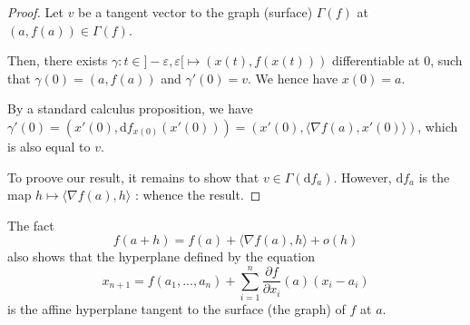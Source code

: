 \begin{proof}
    Let $ v $ be a tangent vector to the graph (surface) $ \Gamma(f) $ at $ (a, f(a)) \in \Gamma(f) $.

    Then, there exists $ \gamma : t \in ]-\varepsilon, \varepsilon[ \mapsto (x(t), f(x(t))) $ differentiable at $ 0 $, such that $ \gamma(0) = (a,f(a)) $ and $ \gamma'(0) = v $. We hence have $ x(0) = a $.

    By a standard calculus proposition, we have $ \gamma'(0) = (x'(0),\mathrm df_{x(0)}(x'(0))) = (x'(0), \langle \nabla f(a), x'(0) \rangle) $, which is also equal to $ v $.

    To proove our result, it remains to show that $ v \in \Gamma(\mathrm d f_a) $. However, $ \mathrm d f_a $ is the map $ h \mapsto \langle \nabla f(a), h \rangle $ : whence the result.
\end{proof}

\begin{remark}
    The fact
    \[
        f(a+h) = f(a) + \langle \nabla f(a), h \rangle + o(h)
    \]
    also shows that the hyperplane defined by the equation
    \[
        x_{n+1} = f(a_1,...,a_n) + \sum_{i=1}^n \frac{\partial f}{\partial x_i}(a)(x_i-a_i)
    \]
    is the affine hyperplane tangent to the surface (the graph) of $ f $ at $ a $.
\end{remark}